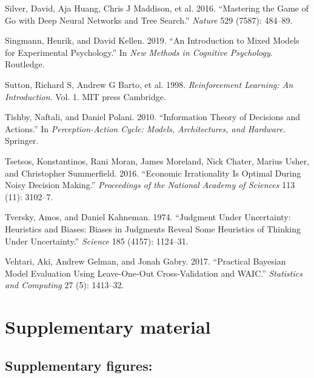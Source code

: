 \documentclass[
  letterpaper,
  DIV=11,
  numbers=noendperiod]{scrartcl}
\newlength{\cslhangindent}
\newenvironment{CSLReferences}[2] %
 {\begin{list}{}{%
  \setlength{\itemindent}{0pt}
  \setlength{\leftmargin}{0pt}
  \setlength{\parsep}{0pt}
  \ifodd #1
   \setlength{\leftmargin}{\cslhangindent}
   \setlength{\itemindent}{-1\cslhangindent}
  \fi
  \setlength{\itemsep}{#2\baselineskip}}}
 {\end{list}}
\begin{document}
\begin{CSLReferences}{1}{1}
{Silver, David, Aja Huang, Chris J Maddison, et al.} 2016. {``Mastering
the Game of Go with Deep Neural Networks and Tree Search.''}
\emph{Nature} 529 (7587): 484--89.

Singmann, Henrik, and David Kellen. 2019. {``An Introduction to Mixed
Models for Experimental Psychology.''} In \emph{New Methods in Cognitive
Psychology}. Routledge.

{Sutton, Richard S, Andrew G Barto, et al.} 1998. \emph{Reinforcement
Learning: An Introduction}. Vol. 1. MIT press Cambridge.

Tishby, Naftali, and Daniel Polani. 2010. {``Information Theory of
Decisions and Actions.''} In \emph{Perception-Action Cycle: Models,
Architectures, and Hardware}. Springer.

Tsetsos, Konstantinos, Rani Moran, James Moreland, Nick Chater, Marius
Usher, and Christopher Summerfield. 2016. {``Economic Irrationality Is
Optimal During Noisy Decision Making.''} \emph{Proceedings of the
National Academy of Sciences} 113 (11): 3102--7.

Tversky, Amos, and Daniel Kahneman. 1974. {``Judgment Under Uncertainty:
Heuristics and Biases: Biases in Judgments Reveal Some Heuristics of
Thinking Under Uncertainty.''} \emph{Science} 185 (4157): 1124--31.

Vehtari, Aki, Andrew Gelman, and Jonah Gabry. 2017. {``Practical
Bayesian Model Evaluation Using Leave-One-Out Cross-Validation and
WAIC.''} \emph{Statistics and Computing} 27 (5): 1413--32.

\end{CSLReferences}

\section{Supplementary material}\label{supplementary-material}

\subsection{Supplementary figures:}\label{supplementary-figures}
\end{document}

